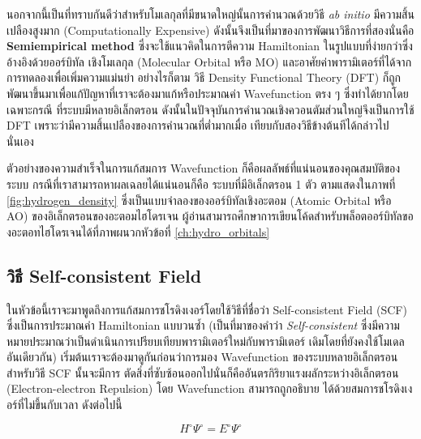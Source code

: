 นอกจากนี้เป็นที่ทราบกันดีว่าสำหรับโมเลกุลที่มีขนาดใหญ่นั้นการคำนวณด้วยวิธี \textit{ab initio} มีความสิ้นเปลืองสูงมาก (Computationally 
Expensive)\autocite{grabowski2011} ดังนั้นจึงเป็นที่มาของการพัฒนาวิธีการที่สองนั่นคือ \textbf{Semiempirical method}%
\autocite{thiel2014,christensen2016,kriz2020} ซึ่งจะใช้แนวคิดในการตีความ Hamiltonian ในรูปแบบที่ง่ายกว่าซึ่งอ้างอิงด้วยออร์บิทัล%
เชิงโมเลกุล (Molecular Orbital หรือ MO) และอาศัยค่าพารามิเตอร์ที่ได้จากการทดลองเพื่อเพิ่มความแม่นยำ อย่างไรก็ตาม วิธี Density 
Functional Theory (DFT) ก็ถูกพัฒนาขึ้นมาเพื่อแก้ปัญหาที่เราจะต้องมาแก้หรือประมาณค่า Wavefunction ตรง ๆ ซึ่งทำได้ยากโดยเฉพาะกรณี%
ที่ระบบมีหลายอิเล็กตรอน ดังนั้นในปัจจุบันการคำนวณเชิงควอนตัมส่วนใหญ่จึงเป็นการใช้ DFT เพราะว่ามีความสิ้นเปลืองของการคำนวณที่ต่ำมากเมื่อ%
เทียบกับสองวิธีข้างต้นทีได้กล่าวไปนั่นเอง

ตัวอย่างของความสำเร็จในการแก้สมการ Wavefunction ก็คือผลลัพธ์ที่แน่นอนของคุณสมบัติของระบบ กรณีที่เราสามารถหาผลเฉลยได้แน่นอนก็คือ%
ระบบที่มีอิเล็กตรอน 1 ตัว ตามแสดงในภาพที่ \ref{fig:hydrogen_density} ซึ่งเป็นแบบจำลองของออร์บิทัลเชิงอะตอม (Atomic Orbital 
หรือ AO) ของอิเล็กตรอนของอะตอมไฮโดรเจน ผู้อ่านสามารถศึกษาการเขียนโค้ดสำหรับพล็อตออร์บิทัลของอะตอทไฮโดรเจนได้ที่ภาพผนวกหัวข้อที่ 
\ref{ch:hydro_orbitals}

\subsection{วิธี Self-consistent Field}
\label{ssec:scf}

ในหัวข้อนี้เราจะมาพูดถึงการแก้สมการชโรดิงเงอร์โดยใช้วิธีที่ชื่อว่า Self-consistent Field (SCF) ซึ่งเป็นการประมาณค่า Hamiltonian 
แบบวนซ้ำ (เป็นที่มาของคำว่า \textit{Self-consistent} ซึ่งมีความหมายประมาณว่าเป็นดำเนินการเปรียบเทียบพารามิเตอร์ใหม่กับพารามิเตอร์%
เดิมโดยที่ยังคงใช้โมเดลอันเดียวกัน) เริ่มต้นเราจะต้องมาดูกันก่อนว่าการมอง Wavefunction ของระบบหลายอิเล็กตรอนสำหรับวิธี SCF นั้นจะมีการ%
ตัดสิ่งที่ซับซ้อนออกไปนั่นก็คืออันตรกิริยาแรงผลักระหว่างอิเล็กตรอน (Electron-electron Repulsion) โดย Wavefunction สามารถถูกอธิบาย%
ได้ด้วยสมการชโรดิงเงอร์ที่ไม่ขึ้นกับเวลา ดังต่อไปนี้\autocite{cramer2004}

\begin{equation}\label{eq:tise_elec}
    H^{\circ} \Psi^{\circ} = E^{\circ} \Psi^{\circ}
\end{equation}

